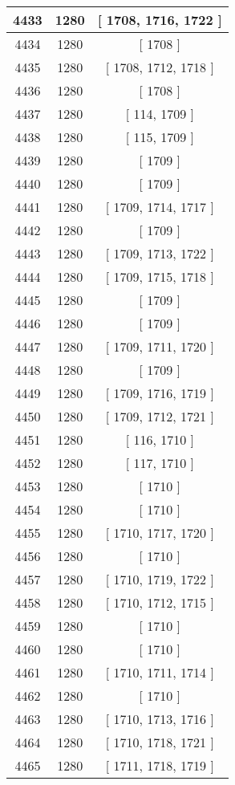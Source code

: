 \begin{center}
\begin{longtable}[H]{|| c c c ||}
\hline
4433 & 1280 & [ 1708, 1716, 1722 ] \\ 
\hline
4434 & 1280 & [ 1708 ] \\ 
\hline
4435 & 1280 & [ 1708, 1712, 1718 ] \\ 
\hline
4436 & 1280 & [ 1708 ] \\ 
\hline
4437 & 1280 & [ 114, 1709 ] \\ 
\hline
4438 & 1280 & [ 115, 1709 ] \\ 
\hline
4439 & 1280 & [ 1709 ] \\ 
\hline
4440 & 1280 & [ 1709 ] \\ 
\hline
4441 & 1280 & [ 1709, 1714, 1717 ] \\ 
\hline
4442 & 1280 & [ 1709 ] \\ 
\hline
4443 & 1280 & [ 1709, 1713, 1722 ] \\ 
\hline
4444 & 1280 & [ 1709, 1715, 1718 ] \\ 
\hline
4445 & 1280 & [ 1709 ] \\ 
\hline
4446 & 1280 & [ 1709 ] \\ 
\hline
4447 & 1280 & [ 1709, 1711, 1720 ] \\ 
\hline
4448 & 1280 & [ 1709 ] \\ 
\hline
4449 & 1280 & [ 1709, 1716, 1719 ] \\ 
\hline
4450 & 1280 & [ 1709, 1712, 1721 ] \\ 
\hline
4451 & 1280 & [ 116, 1710 ] \\ 
\hline
4452 & 1280 & [ 117, 1710 ] \\ 
\hline
4453 & 1280 & [ 1710 ] \\ 
\hline
4454 & 1280 & [ 1710 ] \\ 
\hline
4455 & 1280 & [ 1710, 1717, 1720 ] \\ 
\hline
4456 & 1280 & [ 1710 ] \\ 
\hline
4457 & 1280 & [ 1710, 1719, 1722 ] \\ 
\hline
4458 & 1280 & [ 1710, 1712, 1715 ] \\ 
\hline
4459 & 1280 & [ 1710 ] \\ 
\hline
4460 & 1280 & [ 1710 ] \\ 
\hline
4461 & 1280 & [ 1710, 1711, 1714 ] \\ 
\hline
4462 & 1280 & [ 1710 ] \\ 
\hline
4463 & 1280 & [ 1710, 1713, 1716 ] \\ 
\hline
4464 & 1280 & [ 1710, 1718, 1721 ] \\ 
\hline
4465 & 1280 & [ 1711, 1718, 1719 ] \\ 

\end{longtable}
\end{center}

